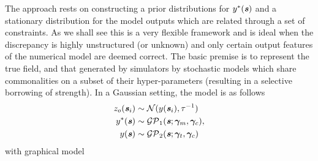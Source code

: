 \documentclass[10pt,a4paper]{article}
\newcommand{\expect} {{\mathbb{E}}}
\newcommand{\thetab} {{\boldsymbol{\theta}}}
\newcommand{\varthetab} {{\boldsymbol{\vartheta}}}
\newcommand{\gammab} {\boldsymbol{\gamma}}
\newcommand{\svec} {\textbf{\textit{s}}}
\begin{document}
%
The approach rests on constructing a prior distributions for $y^*(\svec)$ and a stationary distribution for the model outputs which are related through a set of constraints. As we shall see this is a very flexible framework and is ideal when the discrepancy is highly unstructured (or unknown) and only certain output features of the numerical model are deemed correct. The basic premise is to represent the true field, and that generated by simulators by stochastic models which share commonalities on a subset of their hyper-parameters (resulting in a selective borrowing of strength). In a Gaussian setting, the model is as follows
\begin{align}
z_o(\svec_i) &\sim \mathcal{N}( y(\svec_i),\tau^{-1}) \\
y^*(\svec) &\sim \mathcal{GP}_1(\svec;\gammab_m,\gammab_c), \\
y(\svec) &\sim \mathcal{GP}_2(\svec;\gammab_t,\gammab_c) 
\end{align}
\noindent with graphical model

\begin{figure}[h!]
\centering
{}
\end{figure}
\end{document}
